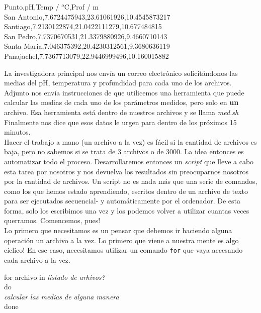 \documentclass[10pt,letterpaper]{article}
\newcommand{\inlinecode}[1]{
\colorbox{light-gray}{\texttt{#1}}
}
\newenvironment{Code}
{
\begin{lrbox}{\selvestebox}%
\begin{minipage}{\dimexpr\columnwidth-2\fboxsep\relax}
\fontfamily{\ttdefault}\selectfont
}
{\end{minipage}\end{lrbox}%
\begin{center}
\colorbox{light-gray}{\usebox{\selvestebox}}
\end{center}
}
\begin{document}
\begin{Code}
Punto,pH,Temp / $^o$C,Prof / m\\
San Antonio,7.6724475943,23.61061926,10.4545873217\\
Santiago,7.2130122874,21.0422111279,10.677484815\\
San Pedro,7.7370670531,21.3379880926,9.4660710143\\
Santa Maria,7.046375392,20.4230312561,9.3680636119\\
Panajachel,7.7367713079,22.9446999496,10.160015882
\end{Code}

La investigadora principal nos env\'ia un correo electr\'onico solicit\'andonos las medias del pH, temperatura y profundidad para cada uno de los archivos. Adjunto nos env\'ia instrucciones de que utilicemos una herramienta que puede calcular las medias de cada uno de los par\'ametros medidos, pero solo en \textbf{un} archivo. Esa herramienta est\'a dentro de nuestros archivos y se llama \emph{med.sh} Finalmente nos dice que esos datos le urgen para dentro de los pr\'oximos 15 minutos.\\

Hacer el trabajo a mano (un archivo a la vez) es f\'acil si la cantidad de archivos es baja, pero no sabemos si se trata de 3 archivos o de 3000. La idea entonces es automatizar todo el proceso. Desarrollaremos entonces un \emph{script} que lleve a cabo esta tarea por nosotros y nos devuelva los resultados sin preocuparnos nosotros por la cantidad de archivos. Un script no es nada m\'as que una serie de comandos, como los que hemos estado aprendiendo, escritos dentro de un archivo de texto para ser ejecutados secuencial- y autom\'aticamente por el ordenador. De esta forma, solo los escribimos una vez y los podemos volver a utilizar cuantas veces querramos. Comencemos, pues!\\

Lo primero que necesitamos es un pensar que debemos ir haciendo alguna operaci\'on un archivo a la vez. Lo primero que viene a nuestra mente es algo c\'iclico! En ese caso, necesitamos utilizar un comando \inlinecode{for} que vaya accesando cada archivo a la vez.

\begin{Code}
for archivo in \emph{listado de arhivos?}\\
do\\
\emph{calcular las medias de alguna manera}\\
done
\end{Code}
\end{document}

